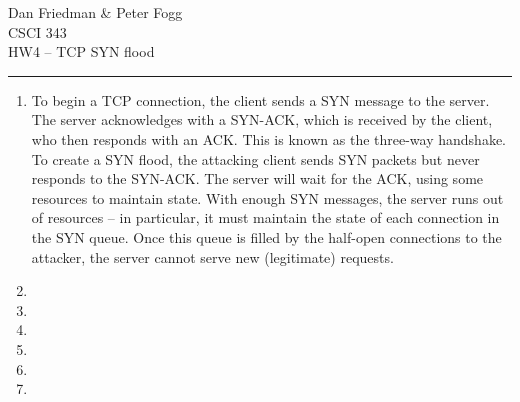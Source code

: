 \documentclass[11pt]{article}
\renewcommand{\maketitle}{
  \begin{center}
    \begin{flushright}
      Dan Friedman \& Peter Fogg \\
      CSCI 343 \\
      HW4 -- TCP SYN flood
    \end{flushright}
    \rule{\linewidth}{0.1mm}
  \end{center}
}
\begin{document}
\maketitle
\begin{enumerate}
\item To begin a TCP connection, the client sends a SYN message to the server. The server acknowledges with a SYN-ACK, which is received by the client, who then responds with an ACK. This is known as the three-way handshake. To create a SYN flood, the attacking client sends SYN packets but never responds to the SYN-ACK. The server will wait for the ACK, using some resources to maintain state. With enough SYN messages, the server runs out of resources -- in particular, it must maintain the state of each connection in the SYN queue. Once this queue is filled by the half-open connections to the attacker, the server cannot serve new (legitimate) requests.
\item
\item
\item
\item
\item
\item
\end{enumerate}
\end{document}
